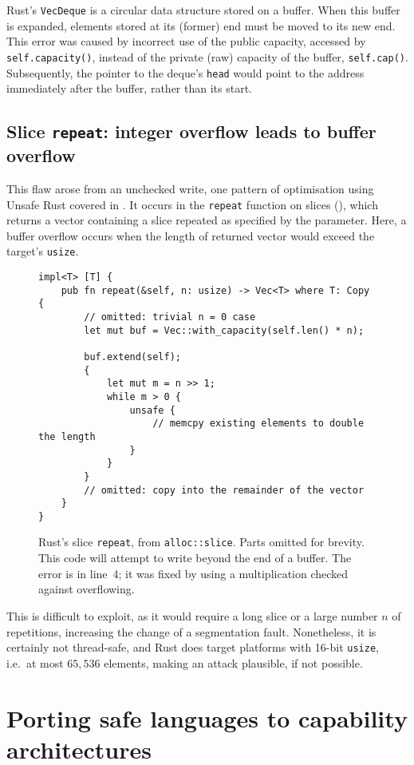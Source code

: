 \documentclass[dissertation.tex]{subfiles}
\begin{document}
Rust's \texttt{VecDeque} is a circular data structure stored on a
buffer.
When this buffer is expanded, elements stored at its (former) end must
be moved to its new end.
This error was caused by incorrect use of the public capacity, accessed
by \texttt{self.capacity()}, instead of the private (raw) capacity of
the buffer, \texttt{self.cap()}.
Subsequently, the pointer to the deque's \texttt{head} would point to
the address immediately after the buffer, rather than its start.



\subsection{Slice \texttt{repeat}: integer overflow leads to buffer overflow}
\label{sec:eval-micro-repeat}

This flaw arose from an unchecked write, one pattern of optimisation
using Unsafe Rust covered in .
It occurs in the \texttt{repeat} function on slices
(), which returns a vector containing a slice
repeated as specified by the parameter.
Here, a buffer overflow occurs when the length of returned vector would
exceed the target's \texttt{usize}.

\begin{figure}[ht]
\begin{lstlisting}
impl<T> [T] {
    pub fn repeat(&self, n: usize) -> Vec<T> where T: Copy {
        // omitted: trivial n = 0 case
        let mut buf = Vec::with_capacity(self.len() * n);

        buf.extend(self);
        {
            let mut m = n >> 1;
            while m > 0 {
                unsafe {
                    // memcpy existing elements to double the length
                }
            }
        }
        // omitted: copy into the remainder of the vector
    }
}
\end{lstlisting}
\caption{ Rust's slice \texttt{repeat}, from
\texttt{alloc::slice}. Parts omitted for brevity. This code will attempt
to write beyond the end of a buffer.
The error is in line~4; it was fixed by using a multiplication checked
against overflowing.}
\label{lst:slice-repeat}
\end{figure}


This is difficult to exploit, as it would require a long slice or a
large number \(n\) of repetitions, increasing the change of a
segmentation fault.
Nonetheless, it is certainly not thread-safe, and Rust does target
platforms with 16-bit \texttt{usize}, i.e.\ at most \(65,536\) elements,
making an attack plausible, if not possible.


\section{Porting safe languages to capability architectures}
\end{document}
